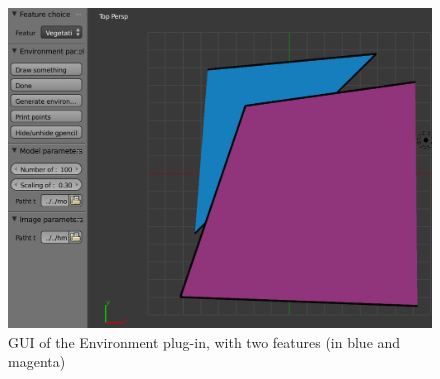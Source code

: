 \begin{figure}
\includegraphics[width=\textwidth]{img/env_gui1.png}
\caption{GUI of the Environment plug-in, with two features (in blue
and magenta)}
\label{fig:env-gui1}
\end{figure}

